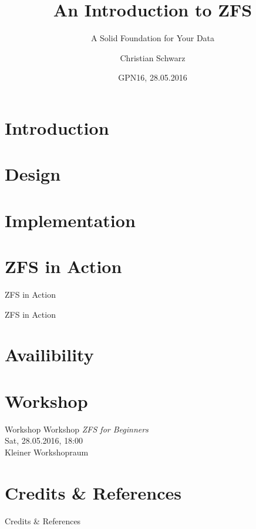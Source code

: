 \documentclass[aspectratio=1610]{beamer}
\begin{document}
\title{An Introduction to ZFS}
\subtitle{A Solid Foundation for Your Data}
\author{Christian Schwarz}
\date{GPN16, 28.05.2016}
\maketitle
%

\section{Introduction}


\section{Design}


\section{Implementation}


\section{ZFS in Action}
\begin{frame}{ZFS in Action}
	\begin{center}
		\Huge ZFS in Action
	\end{center}
\end{frame}
%

\section{Availibility}


\section{Workshop}
\begin{frame}{Workshop}
	\centering
	\huge
	Workshop \textit{ZFS for Beginners} \\
	Sat, 28.05.2016, \alert{18:00} \\
	Kleiner Workshopraum
\end{frame}

\section{Credits \& References}
\begin{frame}[allowframebreaks]{Credits \& References}
	\nocite{*}
	
	
\end{frame}
\end{document}

